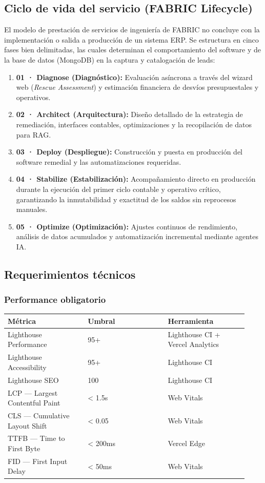 \documentclass[11pt,letterpaper]{article}
\begin{document}
\subsection{Ciclo de vida del servicio (FABRIC Lifecycle)}
El modelo de prestación de servicios de ingeniería de FABRIC no concluye con la implementación o salida a producción de un sistema ERP. Se estructura en cinco fases bien delimitadas, las cuales determinan el comportamiento del software y de la base de datos (MongoDB) en la captura y catalogación de leads:
\begin{enumerate}
\item \textbf{01 · Diagnose (Diagnóstico):} Evaluación asíncrona a través del wizard web (\emph{Rescue Assessment}) y estimación financiera de desvíos presupuestales y operativos.
\item \textbf{02 · Architect (Arquitectura):} Diseño detallado de la estrategia de remediación, interfaces contables, optimizaciones y la recopilación de datos para RAG.
\item \textbf{03 · Deploy (Despliegue):} Construcción y puesta en producción del software remedial y las automatizaciones requeridas.
\item \textbf{04 · Stabilize (Estabilización):} Acompañamiento directo en producción durante la ejecución del primer ciclo contable y operativo crítico, garantizando la inmutabilidad y exactitud de los saldos sin reprocesos manuales.
\item \textbf{05 · Optimize (Optimización):} Ajustes continuos de rendimiento, análisis de datos acumulados y automatización incremental mediante agentes IA.
\end{enumerate}

\subsection{Requerimientos técnicos}

\subsubsection{Performance obligatorio}

\begin{longtable}{p{0.31\linewidth}p{0.31\linewidth}p{0.31\linewidth}}
\toprule
\textbf{Métrica} & \textbf{Umbral} & \textbf{Herramienta} \\
\midrule
Lighthouse Performance & 95+ & Lighthouse CI + Vercel Analytics \\
Lighthouse Accessibility & 95+ & Lighthouse CI \\
Lighthouse SEO & 100 & Lighthouse CI \\
LCP — Largest Contentful Paint & < 1.5s & Web Vitals \\
CLS — Cumulative Layout Shift & < 0.05 & Web Vitals \\
TTFB — Time to First Byte & < 200ms & Vercel Edge \\
FID — First Input Delay & < 50ms & Web Vitals \\
\bottomrule
\end{longtable}
\end{document}
